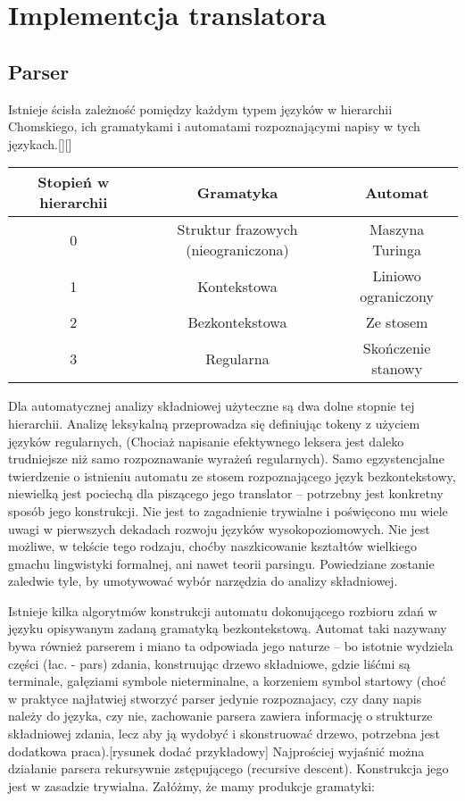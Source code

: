 \chapter{Implementcja translatora}
\section{Parser}
Istnieje ścisła zależność pomiędzy każdym typem języków w hierarchii Chomskiego, ich gramatykami i automatami rozpoznającymi napisy w tych językach.[][]
\begin{center}
\begin{tabular}{|c|c|c|}
\hline
\textbf{Stopień w hierarchii} & \textbf{Gramatyka} & \textbf{Automat} \\ \hline
0 & Struktur frazowych (nieograniczona) & Maszyna Turinga \\ \hline
1 & Kontekstowa & Liniowo ograniczony\\ \hline
2 & Bezkontekstowa & Ze stosem\\ \hline
3 & Regularna & Skończenie stanowy\\ \hline
\end{tabular}
\end{center}

Dla automatycznej analizy składniowej użyteczne są dwa dolne stopnie tej hierarchii. Analizę leksykalną przeprowadza się definiując tokeny z użyciem języków regularnych, (Chociaż napisanie efektywnego leksera jest daleko trudniejsze niż samo rozpoznawanie wyrażeń regularnych).
Samo egzystencjalne twierdzenie o istnieniu automatu ze stosem rozpoznającego język bezkontekstowy, niewielką jest pociechą dla piszącego jego translator – potrzebny jest konkretny sposób jego konstrukcji. Nie jest to zagadnienie trywialne i poświęcono mu wiele uwagi w pierwszych dekadach rozwoju języków wysokopoziomowych. Nie jest możliwe, w tekście tego rodzaju, choćby naszkicowanie kształtów wielkiego gmachu lingwistyki formalnej, ani nawet teorii parsingu. Powiedziane zostanie zaledwie tyle, by umotywować wybór narzędzia do analizy składniowej.

Istnieje kilka algorytmów konstrukcji automatu dokonującego rozbioru zdań w języku opisywanym zadaną gramatyką bezkontekstową. Automat taki nazywany bywa również parserem i miano ta odpowiada jego naturze – bo istotnie wydziela części (łac. - pars) zdania, konstruując drzewo składniowe, gdzie liśćmi są terminale, gałęziami symbole nieterminalne, a korzeniem symbol startowy (choć w praktyce najłatwiej stworzyć parser jedynie rozpoznajacy, czy dany napis należy do języka, czy nie, zachowanie parsera zawiera informację o strukturze składniowej zdania, lecz aby ją wydobyć i skonstruować drzewo, potrzebna jest dodatkowa praca).[rysunek dodać przykładowy]
Najprościej wyjaśnić można działanie parsera rekursywnie zstępującego (recursive descent). Konstrukcja jego jest w zasadzie trywialna. Załóżmy, że mamy produkcje gramatyki:

